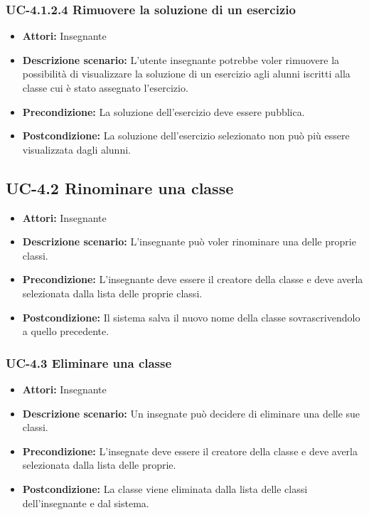 \subsubsection{UC-4.1.2.4 Rimuovere la soluzione di un esercizio}
\begin{itemize}
		\item \textbf{Attori: } Insegnante
		\item \textbf{Descrizione scenario: } L'utente insegnante potrebbe voler rimuovere la possibilità di visualizzare la soluzione di un esercizio agli alunni iscritti alla classe cui è stato assegnato l'esercizio.
		\item \textbf{Precondizione: }  La soluzione dell'esercizio deve essere pubblica.
		\item \textbf{Postcondizione: } La soluzione dell'esercizio selezionato non può più essere visualizzata dagli alunni.
	\end{itemize}
\subsection{UC-4.2 Rinominare una classe}
\begin{itemize}
	\item \textbf{Attori:} Insegnante
	\item \textbf{Descrizione scenario:} L'insegnante può voler rinominare una delle proprie classi.
	\item \textbf{Precondizione:} L'insegnante deve essere il creatore della classe e deve averla selezionata dalla lista delle proprie classi.
	\item \textbf{Postcondizione:} Il sistema salva il nuovo nome della classe sovrascrivendolo a quello precedente.
\end{itemize}
\subsubsection{UC-4.3 Eliminare una classe}
\begin{itemize}
		\item \textbf{Attori: } Insegnante
		\item \textbf{Descrizione scenario: } Un insegnate può decidere di eliminare una delle sue classi. 
		\item \textbf{Precondizione: }  L'insegnate deve essere il creatore della classe e deve averla selezionata dalla lista delle proprie.
		\item \textbf{Postcondizione: } La classe viene eliminata dalla lista delle classi dell'insegnante e dal sistema.
	\end{itemize}

